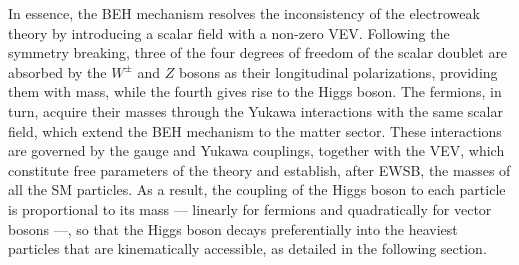 
\noindent In essence, the BEH mechanism resolves the inconsistency of the electroweak theory by introducing a scalar field with a non-zero VEV. Following the symmetry breaking, three of the four degrees of freedom of the scalar doublet are absorbed by the $W^{\pm}$ and $Z$ bosons as their longitudinal polarizations, providing them with mass, while the fourth gives rise to the Higgs boson. The fermions, in turn, acquire their masses through the Yukawa interactions with the same scalar field, which extend the BEH mechanism to the matter sector. These interactions are governed by the gauge and Yukawa couplings, together with the VEV, which constitute free parameters of the theory and establish, after EWSB, the masses of all the SM particles. As a result, the coupling of the Higgs boson to each particle is proportional to its mass — linearly for fermions and quadratically for vector bosons —, so that the Higgs boson decays preferentially into the heaviest particles that are kinematically accessible, as detailed in the following section.



